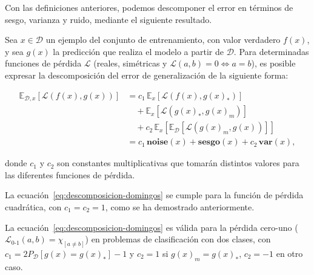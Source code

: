 Con las definiciones anteriores, podemos descomponer el error en términos de sesgo, varianza y ruido, mediante el siguiente resultado.

\begin{definicion}
    Sea $x \in \mathcal{D}$ un ejemplo del conjunto de entrenamiento, con valor verdadero $f(x)$, y sea $g(x)$ la predicción que realiza el modelo a partir de $\mathcal{D}$. Para determinadas funciones de pérdida $\mathcal{L}$ (reales, simétricas y $\mathcal{L}(a,b) = 0 \Leftrightarrow a = b$), es posible expresar la descomposición del error de generalización de la siguiente forma:

    \begin{equation}\label{eq:descomposicion-domingos}
        \begin{aligned}
        \mathbb{E}_{\mathcal{D}, x}[\mathcal{L}(f(x), g(x))] 
        &= c_1 \, \mathbb{E}_{x}[\mathcal{L}(f(x), g(x)_{*})] \\
        &\quad + \mathbb{E}_{x}[\mathcal{L}(g(x)_{*}, g(x)_{m})] \\
        &\quad + c_2 \, \mathbb{E}_{x}[\mathbb{E}_{\mathcal{D}}[\mathcal{L}(g(x)_{m}, g(x))]] \\
        &= c_1 \, \textbf{noise}(x) + \textbf{sesgo}(x) + c_2 \, \textbf{var}(x),
        \end{aligned}
        \end{equation}

    donde $c_1$ y $c_2$ son constantes multiplicativas que tomarán distintos valores para las diferentes funciones de pérdida.
\end{definicion}

\begin{observacion}
    La ecuación~\eqref{eq:descomposicion-domingos} se cumple para la función de pérdida cuadrática, con $c_1 = c_2 = 1$, como se ha demostrado anteriormente.
\end{observacion}

\begin{teorema}
    La ecuación~\eqref{eq:descomposicion-domingos} es válida para la pérdida cero-uno ($\mathcal{L}_{0\text{-}1}(a, b) = \chi_{[a \neq b]}$) en problemas de clasificación con dos clases, con $c_1 = 2P_\mathcal{D}[g(x) = g(x)_*] - 1$ y $c_2 = 1$ si $g(x)_m = g(x)_*$, $c_2 = -1$ en otro caso.
\end{teorema}

